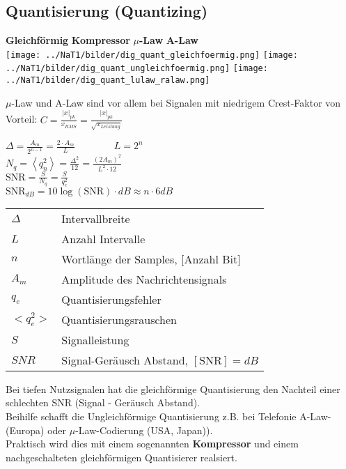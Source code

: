 \subsection{Quantisierung (Quantizing)}
	\begin{center}	
		\textbf{Gleichförmig} \hspace{3cm}
		\textbf{Kompressor} \hspace{2.9cm}
		\textbf{$\mu$-Law} \hspace{3cm}
		\textbf{A-Law}  \\
		\texttt{[image: ../NaT1/bilder/dig\_quant\_gleichfoermig.png]} \hspace{0.5cm}
		\texttt{[image: ../NaT1/bilder/dig\_quant\_ungleichfoermig.png]} \hspace{0.5cm}
		\texttt{[image: ../NaT1/bilder/dig\_quant\_lulaw\_ralaw.png]}	
	\end{center}
	$\mu$-Law und A-Law sind vor allem bei Signalen mit niedrigem Crest-Faktor von
	Vorteil: $C = \frac{\left|x\right|_{pk}}{x_{RMS}} =
	\frac{\left|x\right|_{pk}}{\sqrt{x_{Leistung}}}$
\renewcommand{\arraystretch}{1}
\begin{multicols}{2}
	$ \Delta = \frac{A_m}{2^{n-1}} = \frac{2 \cdot A_m}{L} \qquad \qquad L = 2^n$\\ 
	$ N_q = \left< q_n^2 \right> = \frac{\Delta^2}{12} =
	\frac{\left(2A_m\right)^2}{L^2 \cdot 12}$\\
	$ \text{SNR} =\frac{S}{N_q}=\frac{S}{q_e^2}$\\
	$\text{SNR}_{dB}=10 \log(\text{SNR}) \cdot dB \approx n \cdot 6dB$
\columnbreak

	\begin{tabular}{>{\boldmath}ll}
		$\Delta$ & Intervallbreite \\
		$L$ & Anzahl Intervalle \\
		$n$ & Wortlänge der Samples, [Anzahl Bit] \\
		$A_m$ & Amplitude des Nachrichtensignals \\
		$q_e$ & Quantisierungsfehler \\
		$<q_e^2>$ & Quantisierungsrauschen \\
		$S$ & Signalleistung\\
		$SNR$ & Signal-Geräusch Abstand, $[\text{SNR}] = dB$
	\end{tabular}
\end{multicols}


Bei tiefen Nutzsignalen hat die gleichförmige Quantisierung den Nachteil einer schlechten SNR
(Signal - Geräusch Abstand). \\
Beihilfe schafft die Ungleichförmige Quantisierung z.B. bei Telefonie
A-Law-(Europa) oder $\mu$-Law-Codierung (USA, Japan)). \\
Praktisch wird dies mit einem sogenannten \textbf{Kompressor} und einem nachgeschalteten
gleichförmigen Quantisierer realsiert.

